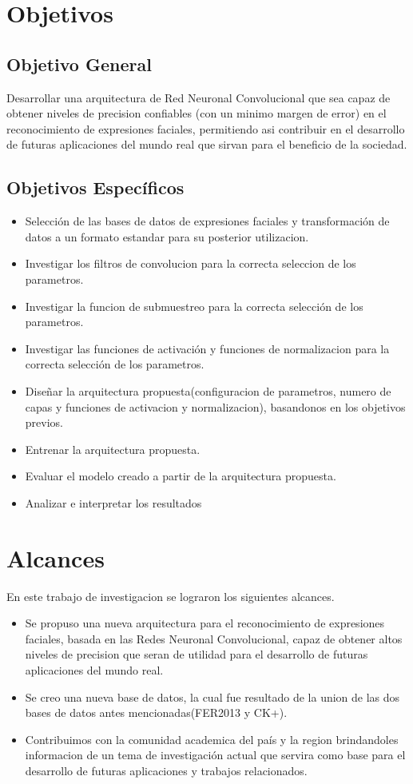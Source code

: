 \section{Objetivos}
\subsection{Objetivo General}
Desarrollar una arquitectura de Red Neuronal Convolucional que sea capaz de obtener niveles de precision confiables (con un minimo margen de error) en el reconocimiento de expresiones faciales, permitiendo asi contribuir en el desarrollo de futuras aplicaciones del mundo real que sirvan para el beneficio de la sociedad.
\subsection{Objetivos Específicos}
\begin{itemize}
\item Selección de las bases de datos de expresiones faciales y transformación de datos a un formato estandar para su posterior utilizacion.
\item Investigar los filtros de convolucion para la correcta seleccion de los parametros.
\item Investigar la funcion de submuestreo para la correcta selección de los parametros. 
\item Investigar las funciones de activación y funciones de normalizacion para la correcta selección de los parametros.
\item Diseñar la arquitectura propuesta(configuracion de parametros, numero de capas y funciones de activacion y normalizacion), basandonos en los objetivos previos.
\item Entrenar la arquitectura propuesta.	
\item Evaluar el modelo creado a partir de la arquitectura propuesta.
\item Analizar e interpretar los resultados
\end{itemize}

\section{Alcances}
En este trabajo de investigacion se lograron los siguientes alcances.

\begin{itemize}
\item Se propuso una nueva arquitectura para el reconocimiento de expresiones faciales, basada en las Redes Neuronal Convolucional, capaz de obtener altos niveles de precision que seran de utilidad para el desarrollo de futuras aplicaciones del mundo real.
\item Se creo una nueva base de datos, la cual fue resultado de la union de las dos bases de datos antes mencionadas(FER2013 y CK+).
\item Contribuimos con la comunidad academica del país y la region brindandoles informacion de un tema de investigación actual que servira como base para el desarrollo de futuras aplicaciones y trabajos relacionados.
\end{itemize}
 

